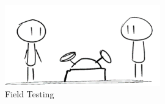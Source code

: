 \begin{figure}[tbh]
\begin{center}
\includegraphics[width=0.6\textwidth]{resources/img/FieldTesting}
\end{center}
\caption{Field Testing \label{systemdiagram}}
\end{figure}

%
%
%

